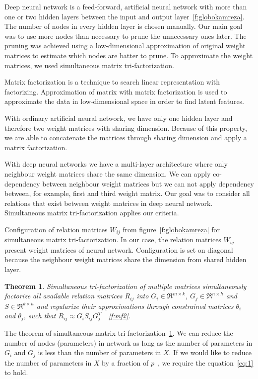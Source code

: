 \documentclass{article} %
\newtheorem{theorem}{Theorem}[section]
\begin{document}
Deep neural network is a feed-forward, artificial neural network with more than
one or two hidden layers between the input and output
layer~\ref{f:globokamreza}. The number of nodes in every hidden layer is chosen
manually. Our main goal was to use more nodes than necessary to prune the
unnecessary ones later. The pruning was achieved using a low-dimensional
approximation of original weight matrices to estimate which nodes are batter to
prune. To approximate the weight matrices, we used simultaneous matrix
tri-factorization.

Matrix factorization is a technique to search linear representation with
factorizing. Approximation of matrix with matrix factorization is used to
approximate the data in low-dimensional space in order to find latent features.

With ordinary artificial neural network, we have only one hidden layer and
therefore two weight matrices with sharing dimension. Because of this property,
we are able to concatenate the matrices through sharing dimension and apply a
matrix factorization.

With deep neural networks we have a multi-layer architecture where only
neighbour weight matrices share the same dimension. We can apply co-dependency
between neighbour weight matrices but we can not apply dependency between, for
example, first and third weight matrix. Our goal was to consider all relations
that exist between weight matrices in deep neural network. Simultaneous matrix
tri-factorization applies our criteria.

Configuration of relation matrices $W_{ij}$ from figure~\ref{f:globokamreza}
for simultaneous matrix tri-factorization. In our case, the relation matrices
$W_{ij}$ present weight matrices of neural network. Configuration is set on
diagonal because the neighbour weight matrices share the dimension from shared
hidden layer.

\begin{theorem}\label{t:2}
Simultaneous tri-factorization of multiple matrices simultaneously 
factorize all available relation matrices $R_{ij}$ into $G_i \in \Re^{m \times 
k}$, $G_j \in \Re^{n \times h}$ and $S \in \Re^{k \times h}$ and regularize 
their approximations through constrained matrices $\theta_i$ and $\theta_j$, 
such that $R_{ij} \approx G_iS_{ij}G_j^T$~\cite{zitnik2015data}~\ref{f:mf2}.
\end{theorem} 

The theorem of simultaneous matrix tri-factorization~\ref{t:2}. We can reduce
the number of nodes (parameters) in network as long as the number of parameters
in $G_i$ and $G_j$ is less than the number of parameters in $X$. If we would
like to reduce the number of parameters in $X$ by a fraction of
$p$~\cite{sainath2013low}, we require the equation~\ref{eq:1} to hold.
\end{document}

